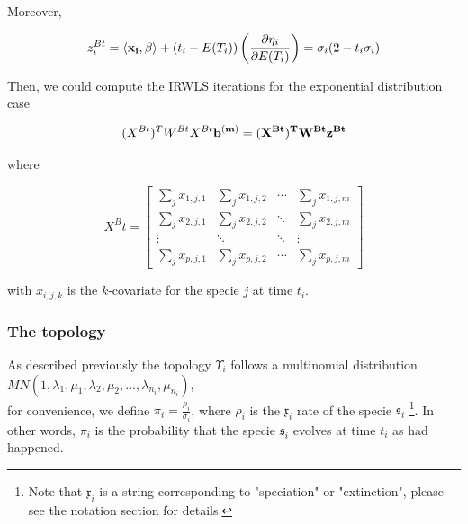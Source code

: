 


Moreover, 

$$
 z_i^{Bt}  = \langle {\bf x_i},\beta \rangle + (t_i - E(T_i)) \left( \frac{\partial \eta_i}{\partial E(T_i)} \right)  = \sigma_i(2-t_i\sigma_i)
$$



Then, we could compute the IRWLS iterations for the exponential distribution case


$$(X^{Bt})^TW^{Bt}X^{Bt}\bf{b}^{(m)}=(X^{Bt})^TW^{Bt}\bf{z}^{Bt}$$

where 

\[
X^Bt=
  \begin{bmatrix}
    \sum_j x_{1,j,1}     &   \sum_j x_{1,j,2} & \cdots &  \sum_j x_{1,j,m} \\
    \sum_j x_{2,j,1}     &   \sum_j x_{2,j,2} & \ddots &  \sum_j x_{2,j,m} \\
    \vdots & \ddots & \ddots  & \vdots \\
     \sum_j x_{p,j,1}     &      \sum_j x_{p,j,2} & \cdots &  \sum_j x_{p,j,m} 
  \end{bmatrix}
\]

with $x_{i,j,k}$ is the $k$-covariate for the specie $j$ at time $t_i$. \\





\subsubsection*{The topology}


 As described previously the topology $\Upsilon_i$ follows a multinomial distribution \\ $MN(1,\lambda_1,\mu_1,\lambda_2,\mu_2,...,\lambda_{n_i},\mu_{n_i})$, \\
 
 
 for convenience, we define $\pi_i=\frac{\rho_i}{\sigma_i}$, where $\rho_i$ is the $\mathfrak{x}_i$ rate of the specie $\mathfrak{s}_i$ \footnote{Note that $\mathfrak{x}_i$ is a string corresponding to "speciation" or "extinction", please see the notation section for details.}. In other words, $\pi_i$ is the probability that the specie $\mathfrak{s}_i$ evolves at time $t_i$ as had happened.
 
